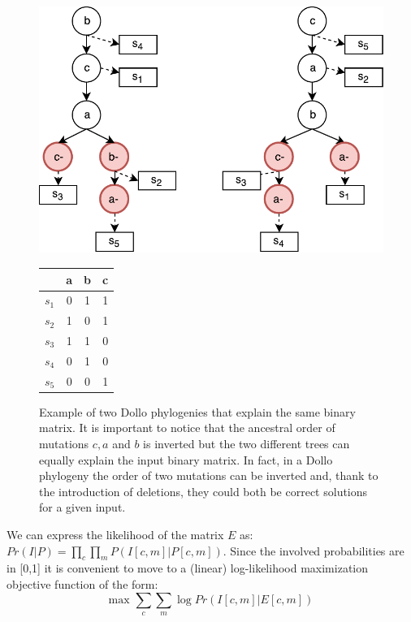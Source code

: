 \documentclass[a4paper,USenglish]{article}
\theoremstyle{definition}
\begin{document}
\begin{figure}[!tb]
  \begin{minipage}{0.72\linewidth}
    \includegraphics[scale=.65]{img/dollo_non_unique}
\end{minipage}
\begin{minipage}{0.2\linewidth}
    \begin{tabular}[!t]{c|ccc}
            & a & b & c \\ \hline
            $s_1$ & 0 & 1 & 1 \\
            $s_2$ & 1 & 0 & 1 \\
            $s_3$ & 1 & 1 & 0 \\
            $s_4$ & 0 & 1 & 0 \\
            $s_5$ & 0 & 0 & 1
\end{tabular}
\end{minipage}
\caption{Example of two Dollo phylogenies that explain the same binary matrix. 
It is important to notice that the ancestral order of mutations $c,a$ and $b$ is inverted but the two different trees can equally explain the input binary matrix. In fact, in a Dollo phylogeny the order of two mutations can be inverted and, thank to the introduction of deletions, they could both be correct solutions for a given input.
}
\label{fig:dollo_non_unique}
\end{figure}

We can express the likelihood of the matrix $E$ as: $Pr(I|P) = \prod_{c} \prod_{m} P(I[c,m] | P[c,m])$.
Since the involved probabilities are in [0,1] it is convenient to move to a (linear) log-likelihood maximization objective function of the form:
\begin{equation}
\label{eq:log-likelihood}
    \mbox{max } \sum_c \sum_m \log Pr\left( I[c,m] | E[c,m]\right)
\end{equation}
\end{document}

